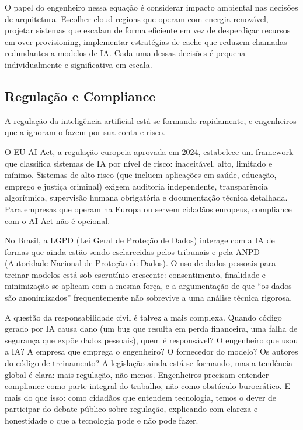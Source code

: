 O papel do engenheiro nessa equação é considerar impacto ambiental nas decisões de arquitetura. Escolher cloud regions que operam com energia renovável, projetar sistemas que escalam de forma eficiente em vez de desperdiçar recursos em over-provisioning, implementar estratégias de cache que reduzem chamadas redundantes a modelos de IA. Cada uma dessas decisões é pequena individualmente e significativa em escala.

\subsection{Regulação e Compliance}

A regulação da inteligência artificial está se formando rapidamente, e engenheiros que a ignoram o fazem por sua conta e risco.

O EU AI Act, a regulação europeia aprovada em 2024, estabelece um framework que classifica sistemas de IA por nível de risco: inaceitável, alto, limitado e mínimo. Sistemas de alto risco (que incluem aplicações em saúde, educação, emprego e justiça criminal) exigem auditoria independente, transparência algorítmica, supervisão humana obrigatória e documentação técnica detalhada. Para empresas que operam na Europa ou servem cidadãos europeus, compliance com o AI Act não é opcional.

No Brasil, a LGPD (Lei Geral de Proteção de Dados) interage com a IA de formas que ainda estão sendo esclarecidas pelos tribunais e pela ANPD (Autoridade Nacional de Proteção de Dados). O uso de dados pessoais para treinar modelos está sob escrutínio crescente: consentimento, finalidade e minimização se aplicam com a mesma força, e a argumentação de que ``os dados são anonimizados'' frequentemente não sobrevive a uma análise técnica rigorosa.

A questão da responsabilidade civil é talvez a mais complexa. Quando código gerado por IA causa dano (um bug que resulta em perda financeira, uma falha de segurança que expõe dados pessoais), quem é responsável? O engenheiro que usou a IA? A empresa que emprega o engenheiro? O fornecedor do modelo? Os autores do código de treinamento? A legislação ainda está se formando, mas a tendência global é clara: mais regulação, não menos. Engenheiros precisam entender compliance como parte integral do trabalho, não como obstáculo burocrático. E mais do que isso: como cidadãos que entendem tecnologia, temos o dever de participar do debate público sobre regulação, explicando com clareza e honestidade o que a tecnologia pode e não pode fazer.

